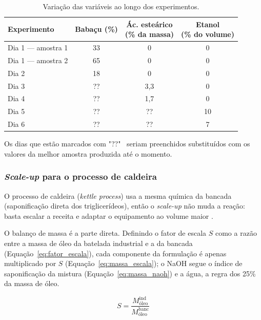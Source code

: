 \begin{table}[H]
    \centering
    \footnotesize
    \caption{Variação das variáveis ao longo dos experimentos.}
    \label{tab:variacao_experimentos}
    \begin{tabular}{lccc}
        \toprule
        \textbf{Experimento} & \textbf{Babaçu (\%)} & \makecell{\textbf{Ác. esteárico}\\\textbf{(\% da massa)}} & \makecell{\textbf{Etanol}\\\textbf{(\% do volume)}} \\
        \midrule
        Dia 1 — amostra 1 & 33 & 0   & 0  \\
        Dia 1 — amostra 2 & 65 & 0   & 0  \\
        Dia 2             & 18 & 0   & 0  \\
        Dia 3             & ?? & 3,3 & 0  \\
        Dia 4             & ?? & 1,7 & 0  \\
        Dia 5             & ?? & ??  & 10 \\
        Dia 6             & ?? & ??  & 7  \\
        \bottomrule
    \end{tabular}
\end{table}

Os dias que estão marcados com "??" ~seriam preenchidos substituídos com os valores da melhor amostra produzida até o momento.

\subsubsection{\textit{Scale-up} para o processo de caldeira}

O processo de caldeira (\textit{kettle process}) usa a mesma química da bancada (saponificação direta dos triglicerídeos), então o \textit{scale-up} não muda a reação: basta escalar a receita e adaptar o equipamento ao volume maior \cite{shreve1984chemical}.

O balanço de massa é a parte direta. Definindo o fator de escala $S$ como a razão entre a massa de óleo da batelada industrial e a da bancada (Equação~\ref{eq:fator_escala}), cada componente da formulação é apenas multiplicado por $S$ (Equação~\ref{eq:massa_escala}); o NaOH segue o índice de saponificação da mistura (Equação~\ref{eq:massa_naoh}) e a água, a regra dos 25\% da massa de óleo.

\begin{equation}
    S = \frac{M_{\text{óleo}}^{\text{ind}}}{M_{\text{óleo}}^{\text{banc}}}
    \label{eq:fator_escala}
\end{equation}

